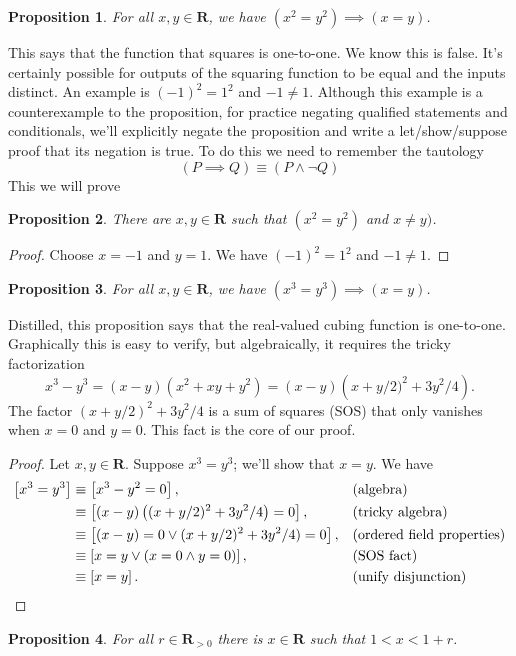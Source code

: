 \documentclass[12pt,fleqn,answers]{article}
\newcommand{\reals}{\mathbf{R}}
\newenvironment{myproof}
  {\begin{shaded}\begin{proof}}
  {\end{proof}\end{shaded}}
\newtheorem{prop}{Proposition}
\begin{document}
     \begin{prop} For all $x,y \in \reals$, we have $(x^2 = y^2) \implies (x=y)$. 
     \end{prop} 
    \noindent This says that the function that squares is one-to-one. We know this is false. It's certainly possible for outputs of 
    the squaring function to be equal and the inputs distinct. An example is $(-1)^2 = 1^2$ and $-1 \neq 1$. Although this example
    is a counterexample to the proposition, for  practice negating qualified statements and conditionals,  we'll explicitly negate the proposition and write a let/show/suppose  proof that its negation is true.
    To do this we need to remember the tautology
    \begin{equation*}
       \left(P \implies Q\right) \equiv \left(P \land \lnot Q\right)
 \end{equation*}
   This we will prove
    \begin{prop} There are $x,y \in \reals$ such that  $(x^2 = y^2)$ and $x\neq y)$. 
     \end{prop} 
     
     \begin{myproof} Choose $x=-1$ and $y=1$. We have $(-1)^2 = 1^2$ and $-1 \neq 1$.      \end{myproof}

    \begin{prop} For all $x,y \in \reals$, we have $(x^3 = y^3) \implies (x=y)$. 
      \end{prop}
\noindent Distilled, this proposition says that the real-valued cubing function is one-to-one. Graphically this is easy to verify, but algebraically, it
requires the tricky factorization
\begin{equation*}
  x^3 - y^3 = (x-y) (x^2+xy+y^2) =  (x-y) \left(x + y/2)^2 + 3 y^2 /4\right).
\end{equation*}
The factor $\left(x + y/2\right)^2 + 3 y^2 /4$ is a sum of squares (SOS) that only vanishes when $x=0$ and $y=0$.  This fact is the core of
our proof.
\begin{myproof}
Let $x,y \in \reals$. Suppose $x^3 = y^3$; we'll show that $x=y$. We have
\begin{align*}
 \left[x^3 = y^3 \right] &\equiv \left [x^3 - y^2 = 0 \right],   &&(\mbox{algebra}) \\
                                        &\equiv \left [(x-y)  \left((x + y/2)^2 + 3 y^2 /4 \right)  = 0 \right],   &&(\mbox{tricky algebra}) \\
                                        &\equiv \left [(x-y) = 0   \lor  (x + y/2)^2 + 3 y^2 /4)  = 0 \right],   &&(\text{ordered field properties}) \\
                                         &\equiv \left [x = y    \lor  \left(x=0 \land y = 0 \right) \right],   &&(\text{SOS fact}) \\
                                         &\equiv \left[x=y\right].  &&(\text{unify disjunction}) \qedhere
\end{align*}
\end{myproof}
    \begin{prop} For all $r \in \reals_{>0}$ there is $x \in \reals$
      such that $1 < x < 1+r$. 
    \end{prop} 
\end{document}
